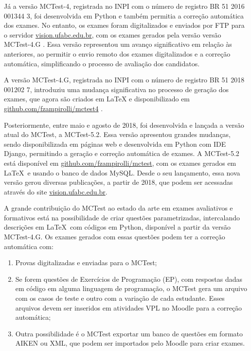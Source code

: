 Já a versão MCTest-4, registrada no INPI com o número de registro BR 51 2016 001344 3, foi desenvolvida em Python e também permitia a correção automática dos exames. No entanto, os exames foram digitalizados e enviados por FTP para o servidor \href{http://vision.ufabc.edu.br}{vision.ufabc.edu.br}, com os exames gerados pela versão  versão MCTest-4.G \cite{2016:Zampirolli.Batista.ea}. Essa versão representou um avanço significativo em relação às anteriores, ao permitir o envio remoto dos exames digitalizados e a correção automática, simplificando o processo de avaliação  dos candidatos.

A versão MCTest-4.G, registrada no INPI com o número de registro BR 51 2018 001202 7, introduziu uma mudança significativa no processo de geração dos exames, que agora são criados em \LaTeX{} e disponibilizado em  \href{https://github.com/fzampirolli/mctest4}{github.com/fzampirolli/mctest4} \cite{2016:Zampirolli.Batista.ea}.

Posteriormente, entre maio e agosto de 2018, foi desenvolvida e lançada a versão atual do MCTest, a MCTest-5.2. Essa versão apresentou grandes mudanças, sendo disponibilizada em páginas web e desenvolvida em Python com IDE Django, permitindo a geração e correção automática de exames. A MCTest-5.2 está disponível em  \href{https://github.com/fzampirolli/mctest}{github.com/fzampirolli/mctest}, com os exames gerados em \LaTeX \ e usando o banco de dados MySQL. Desde o seu lançamento, essa nova versão gerou diversas publicações, a partir de 2018, que podem ser acessadas através do site \href{http://vision.ufabc.edu.br}{vision.ufabc.edu.br}. 

A grande contribuição do MCTest ao estado da arte em exames avaliativos e formativos está na possibilidade de criar questões parametrizadas, intercalando descrições em \LaTeX \ com códigos em Python, disponível a partir da versão MCTest-4.G. Os exames gerados com essas questões podem ter a correção automática com: 

\begin{enumerate}
    \item Provas digitalizadas e enviadas para o MCTest; 
    \item Se forem questões de Exercícios de Programação (EP), com respostas dadas em código em alguma linguagem de programação, o MCTest gera um arquivo com os casos de teste e outro com a variação de cada estudante. Esses arquivos devem ser inseridos em atividades VPL no Moodle para a correção automática; 
    \item Outra possibilidade é o MCTest exportar um banco de questões em formato AIKEN ou XML, que podem ser importados pelo Moodle para criar exames. 
\end{enumerate}


